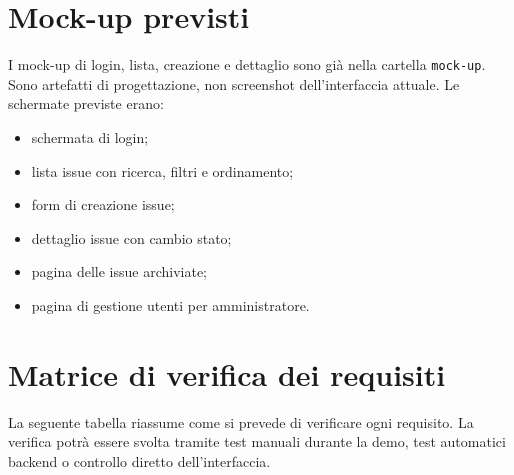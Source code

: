 \documentclass[12pt,a4paper]{article}
\begin{document}
\section{Mock-up previsti}

I mock-up di login, lista, creazione e dettaglio sono già nella cartella \texttt{mock-up}. Sono artefatti di progettazione, non screenshot dell'interfaccia attuale. Le schermate previste erano:

\begin{itemize}[noitemsep]
    \item schermata di login;
    \item lista issue con ricerca, filtri e ordinamento;
    \item form di creazione issue;
    \item dettaglio issue con cambio stato;
    \item pagina delle issue archiviate;
    \item pagina di gestione utenti per amministratore.
\end{itemize}

\clearpage
\section{Matrice di verifica dei requisiti}

La seguente tabella riassume come si prevede di verificare ogni requisito. La verifica potrà essere svolta tramite test manuali durante la demo, test automatici backend o controllo diretto dell'interfaccia.
\end{document}
